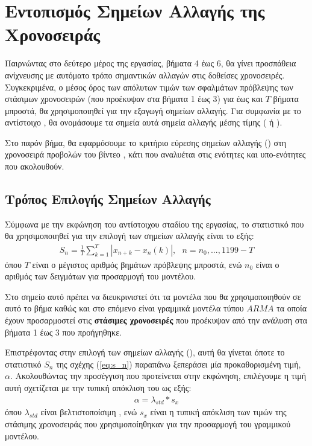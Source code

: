 \chapter{Εντοπισμός Σημείων Αλλαγής της Χρονοσειράς }
\label{ch:step4}
\thispagestyle{fancy}

Παιρνώντας στο δεύτερο μέρος της εργασίας, βήματα 4 έως 6, θα γίνει προσπάθεια ανίχνευσης με αυτόματο τρόπο σημαντικών αλλαγών στις δοθείσες χρονοσειρές. Συγκεκριμένα, ο μέσος όρος των απόλυτων τιμών των σφαλμάτων πρόβλεψης των στάσιμων χρονοσειρών (που προέκυψαν στα βήματα 1 έως 3) για έως και $T$ βήματα μπροστά, θα χρησιμοποιηθεί για την εξαγωγή σημείων αλλαγής. Για συμφωνία με το αντίστοιχο , θα ονομάσουμε τα σημεία αυτά σημεία αλλαγής μέσης τίμης ( ή ).

\par Στο παρόν βήμα, θα εφαρμόσουμε το κριτήριο εύρεσης σημείων αλλαγής () στη χρονοσειρά προβολών του βίντεο , κάτι που αναλυέται στις ενότητες και υπο-ενότητες που ακολουθούν.

\section{Τρόπος Επιλογής Σημείων Αλλαγής}

Σύμφωνα με την εκφώνηση του αντίστοιχου σταδίου της εργασίας, το στατιστικό που θα χρησιμοποιηθεί για την επιλογή των σημείων αλλαγής είναι το εξής:
\begin{align}
S_n = \frac{1}{T} \sum_{k=1}^{T} \left| x_{n+k} - x_n(k) \right|, \ \ \ n=n_0,...,1199-T
\label{eq:s_n}
\end{align}
όπου $T$ είναι ο μέγιστος αριθμός βημάτων πρόβλεψης μπροστά, ενώ $n_0$ είναι ο αριθμός των δειγμάτων  για προσαρμογή του μοντέλου.

\par Στο σημείο αυτό πρέπει να διευκρινιστεί ότι τα μοντέλα που θα χρησιμοποιηθούν σε αυτό το βήμα καθώς και στο επόμενο είναι γραμμικά μοντέλα τύπου $ARMA$ τα οποία έχουν προσαρμοστεί στις \textbf{στάσιμες χρονοσειρές} που προέκυψαν από την ανάλυση στα βήματα 1 έως 3 που προήγηθηκε.

\par Επιστρέφοντας στην επιλογή των σημείων αλλαγής (), αυτή θα γίνεται όποτε το στατιστικό $S_n$ της σχέχης (\ref{eq:s_n}) παραπάνω ξεπεράσει μία προκαθορισμένη τιμή, $\alpha$. Ακολουθώντας την προσέγγιση που προτείνεται στην εκφώνηση, επιλέγουμε η τιμή αυτή σχετίζεται με την τυπική απόκλιση του  ως εξής:
\begin{align}
\alpha = \lambda_{std} * s_x
\label{eq:alpha}
\end{align}
όπου $\lambda_{std}$ είναι βελτιστοποίσιμη , ενώ $s_x$ είναι η τυπική απόκλιση των τιμών της στάσιμης χρονοσειράς που χρησιμοποίηθηκαν για την προσαρμογή του γραμμικού μοντέλου.

